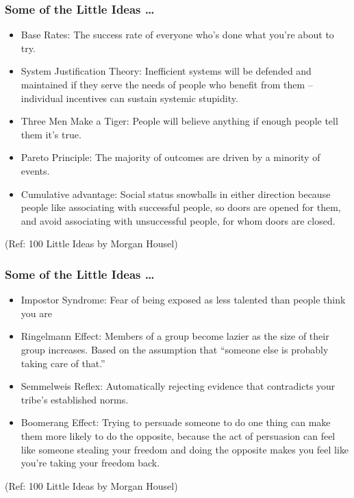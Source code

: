 \begin{frame}[fragile]\frametitle{ Some of the Little Ideas \ldots}

	\begin{itemize}
	\item Base Rates: The success rate of everyone who’s done what you’re about to try.
	\item System Justification Theory: Inefficient systems will be defended and maintained if they serve the needs of people who benefit from them – individual incentives can sustain systemic stupidity.
	\item Three Men Make a Tiger: People will believe anything if enough people tell them it’s true.
	\item Pareto Principle: The majority of outcomes are driven by a minority of events.
	\item Cumulative advantage: Social status snowballs in either direction because people like associating with successful people, so doors are opened for them, and avoid associating with unsuccessful people, for whom doors are closed.
	\end{itemize}

{\tiny (Ref: 100 Little Ideas by Morgan Housel)}

\end{frame}

\begin{frame}[fragile]\frametitle{ Some of the Little Ideas \ldots}

	\begin{itemize}
	\item Impostor Syndrome: Fear of being exposed as less talented than people think you are
	\item Ringelmann Effect: Members of a group become lazier as the size of their group increases. Based on the assumption that “someone else is probably taking care of that.”
	\item Semmelweis Reflex: Automatically rejecting evidence that contradicts your tribe’s established norms. 
	\item Boomerang Effect: Trying to persuade someone to do one thing can make them more likely to do the opposite, because the act of persuasion can feel like someone stealing your freedom and doing the opposite makes you feel like you’re taking your freedom back.
	\end{itemize}

{\tiny (Ref: 100 Little Ideas by Morgan Housel)}

\end{frame}


